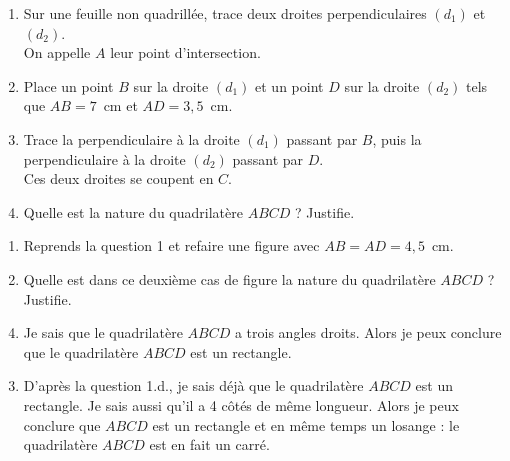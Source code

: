 \begin{myenumerate}
\item
\begin{enumerate}
\item Sur une feuille non quadrillée, trace deux droites perpendiculaires $(d_1)$ et $(d_2)$.\\
On appelle $A$ leur point d'intersection.
\item Place un point $B$ sur la droite $(d_1)$ et un point $D$ sur la droite $(d_2)$ tels que $AB=7$~cm  et $AD=3,5$~cm.
\item Trace la perpendiculaire à la droite $(d_1)$ passant par $B$, puis la perpendiculaire à la droite $(d_2)$ passant par $D$.\\Ces deux droites se coupent en $C$.
\item Quelle est la nature du quadrilatère $ABCD$ ? Justifie.
\end{enumerate}
\item
\begin{enumerate}
\item Reprends la question 1 et refaire une figure avec $AB=AD=4,5$~cm.
\item Quelle est dans ce deuxième cas de figure la nature du quadrilatère $ABCD$ ? Justifie.
\end{enumerate}
\end{myenumerate}
\begin{myenumerate}
  \item
    \begin{enumerate}
      \setcounter{enumii}{3}
    \item Je sais que le quadrilatère $ABCD$ a trois angles droits. Alors je peux conclure que le quadrilatère $ABCD$ est un rectangle.
    \end{enumerate}
  \item
    \begin{enumerate}
      \setcounter{enumii}{2}
    \item D'après la question 1.d., je sais déjà que le quadrilatère $ABCD$ est un rectangle. Je sais aussi qu'il a 4 côtés de même longueur. Alors je peux conclure que $ABCD$ est un rectangle et en même temps un losange : le quadrilatère $ABCD$ est en fait un carré.
    \end{enumerate}
\end{myenumerate}